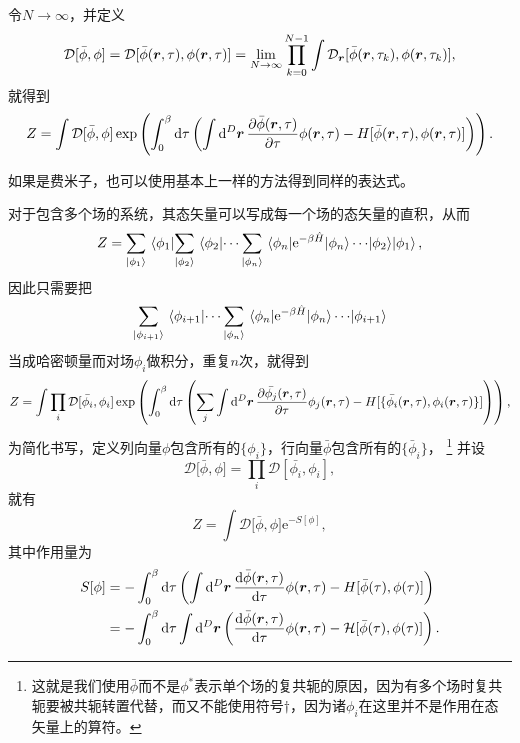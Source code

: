 \documentclass[hyperref, UTF8, a4paper]{ctexart}
\newcommand*{\ee}{\mathrm{e}}
\newcommand*{\fd}[1]{\mathcal{D}{#1}}
\begin{document}
令$N \to \infty$，并定义
\begin{equation}
    \mathcal{D} [\bar{\phi}, \phi] = \mathcal{D} [\bar{\phi}(\vb*{r}, \tau), \phi(\vb*{r}, \tau)] = \lim_{N \to \infty} \prod_{k=0}^{N-1} \int \mathcal{D}_{\vb*{r}}[ \bar{\phi}(\vb*{r}, \tau_k), \phi(\vb*{r}, \tau_k) ],
\end{equation}
就得到
\begin{equation}
    Z = \int \fd{[\bar{\phi}, \phi]} \exp \left( \int_0^\beta \dd{\tau} \left( \int \dd[D]{\vb*{r}} \pdv{\bar{\phi}(\vb*{r}, \tau)}{\tau} \phi(\vb*{r}, \tau) - H[\bar{\phi}(\vb*{r}, \tau), \phi(\vb*{r}, \tau)] \right) \right).
    \label{eq:one-field-partition-function}
\end{equation}

如果是费米子，也可以使用基本上一样的方法得到同样的表达式。

对于包含多个场的系统，其态矢量可以写成每一个场的态矢量的直积，从而
\[
    Z = \sum_{\ket{\phi_1}} \mel{\phi_1}{  \sum_{\ket{\phi_2}} \mel{\phi_2}{\cdots \sum_{\ket{\phi_n}} \mel{\phi_n}{\ee^{-\beta \hat{H}}}{\phi_n} \cdots}{\phi_2} }{\phi_1},
\]
因此只需要把
\[
    \sum_{\ket{\phi_{i+1}}} \mel{\phi_{i+1}}{\cdots \sum_{\ket{\phi_n}} \mel{\phi_n}{\ee^{-\beta \hat{H}}}{\phi_n} \cdots}{\phi_{i+1}}
\]
当成哈密顿量而对场$\phi_i$做积分，重复$n$次，就得到
\[
    Z = \int \prod_i \fd{[\bar{\phi_i}, \phi_i]} \exp \left( \int_0^\beta \dd{\tau} \left( \sum_j \int \dd[D]{\vb*{r}} \pdv{\bar{\phi_j}(\vb*{r}, \tau)}{\tau} \phi_j(\vb*{r}, \tau) - H[\{\bar{\phi_i}(\vb*{r}, \tau), \phi_i(\vb*{r}, \tau)\}] \right) \right),
\]
为简化书写，定义列向量$\phi$包含所有的$\{\phi_i\}$，行向量$\bar{\phi}$包含所有的$\{\bar{\phi}_i\}$，%
\footnote{这就是我们使用$\bar{\phi}$而不是$\phi^*$表示单个场的复共轭的原因，因为有多个场时复共轭要被共轭转置代替，而又不能使用符号$\dagger$，因为诸$\phi_i$在这里并不是作用在态矢量上的算符。}%
并设
\begin{equation}
    \fd[\bar{\phi}, \phi] = \prod_i \fd{[\bar{\phi_i}, \phi_i]},
\end{equation}
就有
\begin{equation}
    Z = \int \fd[\bar{\phi}, \phi] \ee^{ - S[\phi]},
\end{equation}
其中作用量为
\begin{equation}
    \begin{aligned}
        S[\phi] &= - \int_0^\beta \dd{\tau} \left( \int \dd[D]{\vb*{r}} \dv{\bar{\phi}(\vb*{r}, \tau)}{\tau} \phi(\vb*{r}, \tau) - H[\bar{\phi}(\tau), \phi(\tau)] \right) \\
        &= - \int_0^\beta \dd{\tau} \int \dd[D]{\vb*{r}} \left( \dv{\bar{\phi}(\vb*{r}, \tau)}{\tau} \phi(\vb*{r}, \tau) - \mathcal{H}[\bar{\phi}(\tau), \phi(\tau)] \right).
    \end{aligned}
\end{equation}
\end{document}
